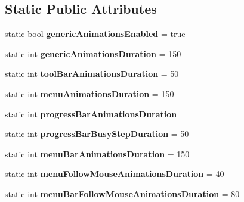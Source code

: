 \subsection*{Static Public Attributes}
\begin{DoxyCompactItemize}
\item 
\mbox{\label{struct_mg_style_config_data_a799d2e011cb90034a672c0ec8c9e5d2c}} 
static bool {\bfseries generic\+Animations\+Enabled} = true
\item 
\mbox{\label{struct_mg_style_config_data_a48af01b43c8de04d9ee252f7666e92dd}} 
static int {\bfseries generic\+Animations\+Duration} = 150
\item 
\mbox{\label{struct_mg_style_config_data_a7f6f8180ddc2a84c05d58686b0b10241}} 
static int {\bfseries tool\+Bar\+Animations\+Duration} = 50
\item 
\mbox{\label{struct_mg_style_config_data_a855bbfcd629f79436eae245242c09d1f}} 
static int {\bfseries menu\+Animations\+Duration} = 150
\item 
\mbox{\label{struct_mg_style_config_data_ae9b0c9080c5f24218e309b78a39528f9}} 
static int {\bfseries progress\+Bar\+Animations\+Duration}
\item 
\mbox{\label{struct_mg_style_config_data_af604a3fd6f7b5e35051f344caf9fb10a}} 
static int {\bfseries progress\+Bar\+Busy\+Step\+Duration} = 50
\item 
\mbox{\label{struct_mg_style_config_data_a74ccd6c553d6e230c3617ac38cc8d667}} 
static int {\bfseries menu\+Bar\+Animations\+Duration} = 150
\item 
\mbox{\label{struct_mg_style_config_data_a9cc930b7546f02787718f5f901a5541e}} 
static int {\bfseries menu\+Follow\+Mouse\+Animations\+Duration} = 40
\item 
\mbox{\label{struct_mg_style_config_data_a0f83a76b09e08311002ad2a1dee7e248}} 
static int {\bfseries menu\+Bar\+Follow\+Mouse\+Animations\+Duration} = 80

\end{DoxyCompactItemize}
